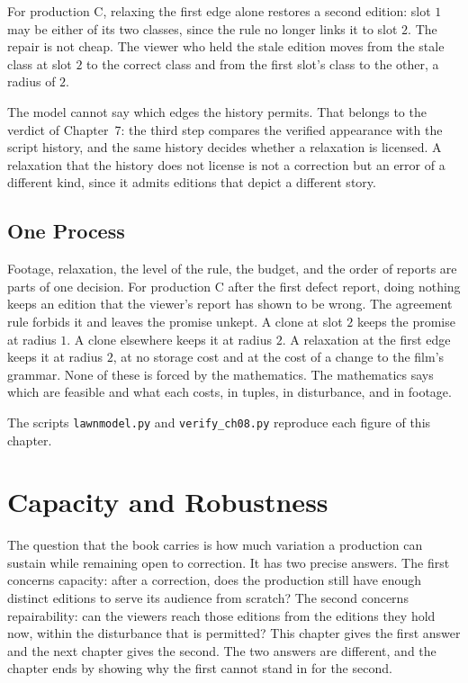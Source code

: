 \documentclass[11pt,twoside,openright]{book}
\theoremstyle{plain}
\theoremstyle{definition}
\theoremstyle{remark}
\begin{document}
For production C, relaxing the first edge alone restores a second edition: slot $1$ may be either of its two classes, since the rule no longer links it to slot $2$. The repair is not cheap. The viewer who held the stale edition moves from the stale class at slot $2$ to the correct class and from the first slot's class to the other, a radius of $2$.

The model cannot say which edges the history permits. That belongs to the verdict of Chapter~7: the third step compares the verified appearance with the script history, and the same history decides whether a relaxation is licensed. A relaxation that the history does not license is not a correction but an error of a different kind, since it admits editions that depict a different story.

\section{One Process}\label{sec:process}

Footage, relaxation, the level of the rule, the budget, and the order of reports are parts of one decision. For production C after the first defect report, doing nothing keeps an edition that the viewer's report has shown to be wrong. The agreement rule forbids it and leaves the promise unkept. A clone at slot $2$ keeps the promise at radius $1$. A clone elsewhere keeps it at radius $2$. A relaxation at the first edge keeps it at radius $2$, at no storage cost and at the cost of a change to the film's grammar. None of these is forced by the mathematics. The mathematics says which are feasible and what each costs, in tuples, in disturbance, and in footage.

The scripts \texttt{lawnmodel.py} and \texttt{verify\_ch08.py} reproduce each figure of this chapter.

\chapter{Capacity and Robustness}
\label{ch:capacity}

The question that the book carries is how much variation a production can sustain while remaining open to correction. It has two precise answers. The first concerns capacity: after a correction, does the production still have enough distinct editions to serve its audience from scratch? The second concerns repairability: can the viewers reach those editions from the editions they hold now, within the disturbance that is permitted? This chapter gives the first answer and the next chapter gives the second. The two answers are different, and the chapter ends by showing why the first cannot stand in for the second.
\end{document}
